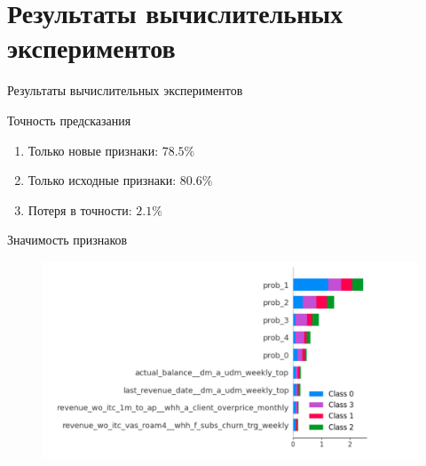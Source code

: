 \documentclass[10pt,pdf,hyperref={unicode}]{beamer}
\renewcommand{\figurename}{}{}%
\renewcommand{\figurename}{\relax}%
\begin{document}
\section{Результаты вычислительных экспериментов}
\begin{frame}{Результаты вычислительных экспериментов}
	
	\begin{block}{Точность предсказания}
		\begin{enumerate}[1)]
		\item Только новые признаки: $78.5\%$
		\item Только исходные признаки: $80.6\%$
		\item Потеря в точности: $2.1\%$
	\end{enumerate}	

		
	\end{block}
	
	
	\begin{block}{Значимость признаков}
 
 	\begin{figure}[h!]
 	
 	\begin{minipage}{0.8\textwidth}
 		\centering
 		\includegraphics[width=\linewidth]{../figures/deephit_shap_baseline1.2.png}
 		\renewcommand{\figurename}{}{}%
 	\end{minipage}
 \end{figure}
 
	\end{block}
	
\end{frame}



\end{document}
